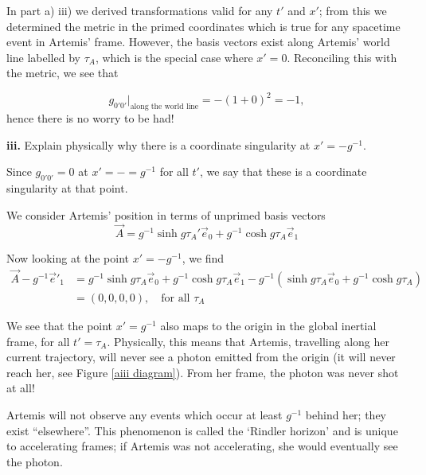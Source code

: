 \documentclass[a4paper]{article} %
\begin{document}
In part a) iii) we derived transformations valid for any $t'$ and $x'$; from this we determined the metric in the primed coordinates which is true for any spacetime event in Artemis' frame. However, the basis vectors exist along Artemis' world line labelled by $\tau_A$, which is the special case where $x'=0$. Reconciling this with the metric, we see that

\begin{equation}
g_{0'0'}\rvert_{\text{along the world line}}=-(1+0)^2=-1,
\end{equation}
hence there is no worry to be had!



\begin{framed}
\textbf{iii.} Explain physically why there is a coordinate singularity at $x'=-g^{-1}$.
\end{framed}

Since $g_{0'0'}=0$ at $x'=-=g^{-1}$ for all $t'$, we say that these is a coordinate singularity at that point.

We consider Artemis' position in terms of unprimed basis vectors
\begin{equation}
\vec{A}= g^{-1}\sinh g\tau_A' \vec{e}_0 + g^{-1}\cosh g\tau_A \vec{e}_1
\end{equation}

Now looking at the point $x'=-g^{-1}$, we find
\begin{align}
\vec{A}-g^{-1}\vec{e}'_1&=g^{-1}\sinh g\tau_A \vec{e}_0 + g^{-1}\cosh g\tau_A \vec{e}_1-g^{-1}(\sinh g\tau_A \vec{e}_0 
+ g^{-1}\cosh g\tau_A)\\
&=(0,0,0,0), \quad\text{for all $\tau_A$}
\end{align}

We see that the point $x'=g^{-1}$ also maps to the origin in the global inertial frame, for all $t'=\tau_A$. Physically, this means that Artemis, travelling along her current trajectory, will never see a photon emitted from the origin (it will never reach her, see Figure \ref{aiii diagram}). From her frame, the photon was never shot at all! 

Artemis will not observe any events which occur at least $g^{-1}$ behind her; they exist ``elsewhere''. This phenomenon is called the `Rindler horizon' and is unique to accelerating frames; if Artemis was not accelerating, she would eventually see the photon.
\end{document}
